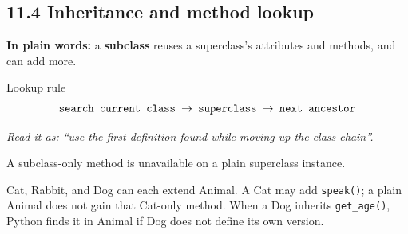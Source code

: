 \documentclass[11pt]{article}
\begin{document}
\begin{keepsection}
\section{11.4 Inheritance and method lookup}

\begin{plainbox}\textbf{In plain words:} a \textbf{subclass} reuses a superclass’s attributes and methods, and can add more.\end{plainbox}

\begin{equationcard}{Lookup rule}
\[ \begin{gathered} \texttt{search current class \ensuremath{\to} superclass \ensuremath{\to} next ancestor} \end{gathered} \]
{\small \emph{Read it as: “use the first definition found while moving up the class chain”.}\par A subclass-only method is unavailable on a plain superclass instance.}
\end{equationcard}

\begin{center}
\begin{minipage}[t]{0.950\linewidth}\centering
{}\par{}\end{minipage}
\end{center}

Cat, Rabbit, and Dog can each extend Animal. A Cat may add \texttt{speak()}; a plain Animal does not gain that Cat-only method. When a Dog inherits \texttt{get\_age()}, Python finds it in Animal if Dog does not define its own version.


\end{keepsection}
\end{document}
